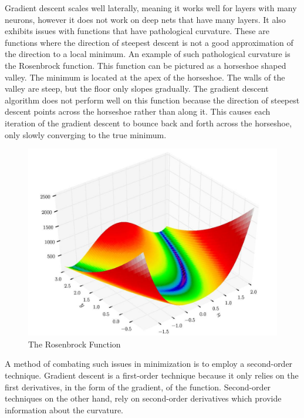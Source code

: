 \documentclass[]{article}
\theoremstyle{plain}
\theoremstyle{definition}
\begin{document}
Gradient descent scales well laterally, meaning it works well for layers with many neurons, however it does not work on deep nets that have many layers. It also exhibits issues with functions that have pathological curvature. These are functions where the direction of steepest descent is not a good approximation of the direction to a local minimum. An example of such pathological curvature is the Rosenbrock function. This function can be pictured as a horseshoe shaped valley. The minimum is located at the apex of the horseshoe. The walls of the valley are steep, but the floor only slopes gradually. The gradient descent algorithm does not perform well on this function because the direction of steepest descent points across the horseshoe rather than along it. This causes each iteration of the gradient descent to bounce back and forth across the horseshoe, only slowly converging to the true minimum. 

\begin{figure}['h']
\centering
\includegraphics[scale=0.25]{rosenbrock.jpg}
\caption{The Rosenbrock Function}
\end{figure}

A method of combating such issues in minimization is to employ a second-order technique. Gradient descent is a first-order technique because it only relies on the first derivatives, in the form of the gradient, of the function. Second-order techniques on the other hand, rely on second-order derivatives which provide information about the curvature. 
\end{document}
